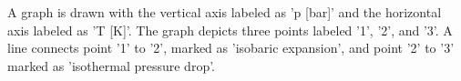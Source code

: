 A graph is drawn with the vertical axis labeled as 'p [bar]' and the horizontal axis labeled as 'T [K]'. The graph depicts three points labeled '1', '2', and '3'. A line connects point '1' to '2', marked as 'isobaric expansion', and point '2' to '3' marked as 'isothermal pressure drop'.